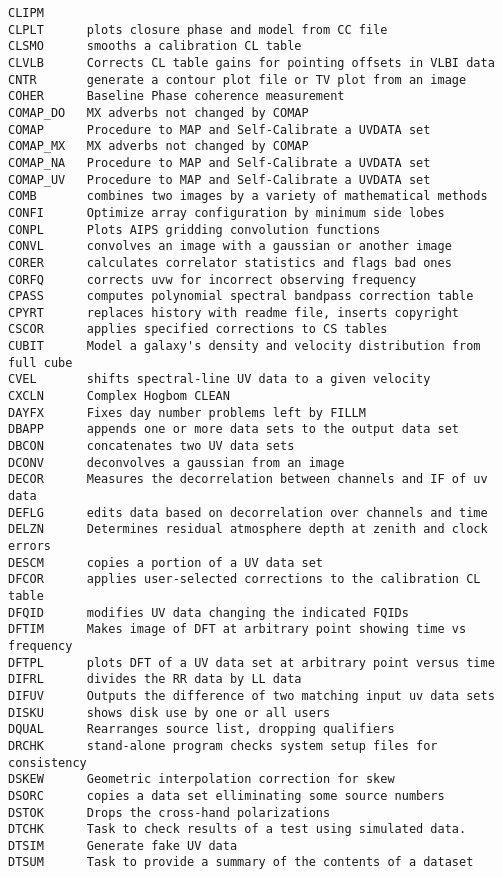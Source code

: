 \begin{verbatim}
CLIPM
CLPLT      plots closure phase and model from CC file
CLSMO      smooths a calibration CL table
CLVLB      Corrects CL table gains for pointing offsets in VLBI data
CNTR       generate a contour plot file or TV plot from an image
COHER      Baseline Phase coherence measurement
COMAP_DO   MX adverbs not changed by COMAP
COMAP      Procedure to MAP and Self-Calibrate a UVDATA set
COMAP_MX   MX adverbs not changed by COMAP
COMAP_NA   Procedure to MAP and Self-Calibrate a UVDATA set
COMAP_UV   Procedure to MAP and Self-Calibrate a UVDATA set
COMB       combines two images by a variety of mathematical methods
CONFI      Optimize array configuration by minimum side lobes
CONPL      Plots AIPS gridding convolution functions
CONVL      convolves an image with a gaussian or another image
CORER      calculates correlator statistics and flags bad ones
CORFQ      corrects uvw for incorrect observing frequency
CPASS      computes polynomial spectral bandpass correction table
CPYRT      replaces history with readme file, inserts copyright
CSCOR      applies specified corrections to CS tables
CUBIT      Model a galaxy's density and velocity distribution from full cube
CVEL       shifts spectral-line UV data to a given velocity
CXCLN      Complex Hogbom CLEAN
DAYFX      Fixes day number problems left by FILLM
DBAPP      appends one or more data sets to the output data set
DBCON      concatenates two UV data sets
DCONV      deconvolves a gaussian from an image
DECOR      Measures the decorrelation between channels and IF of uv data
DEFLG      edits data based on decorrelation over channels and time
DELZN      Determines residual atmosphere depth at zenith and clock errors
DESCM      copies a portion of a UV data set
DFCOR      applies user-selected corrections to the calibration CL table
DFQID      modifies UV data changing the indicated FQIDs
DFTIM      Makes image of DFT at arbitrary point showing time vs frequency
DFTPL      plots DFT of a UV data set at arbitrary point versus time
DIFRL      divides the RR data by LL data
DIFUV      Outputs the difference of two matching input uv data sets
DISKU      shows disk use by one or all users
DQUAL      Rearranges source list, dropping qualifiers
DRCHK      stand-alone program checks system setup files for consistency
DSKEW      Geometric interpolation correction for skew
DSORC      copies a data set elliminating some source numbers
DSTOK      Drops the cross-hand polarizations
DTCHK      Task to check results of a test using simulated data.
DTSIM      Generate fake UV data
DTSUM      Task to provide a summary of the contents of a dataset

\end{verbatim}
